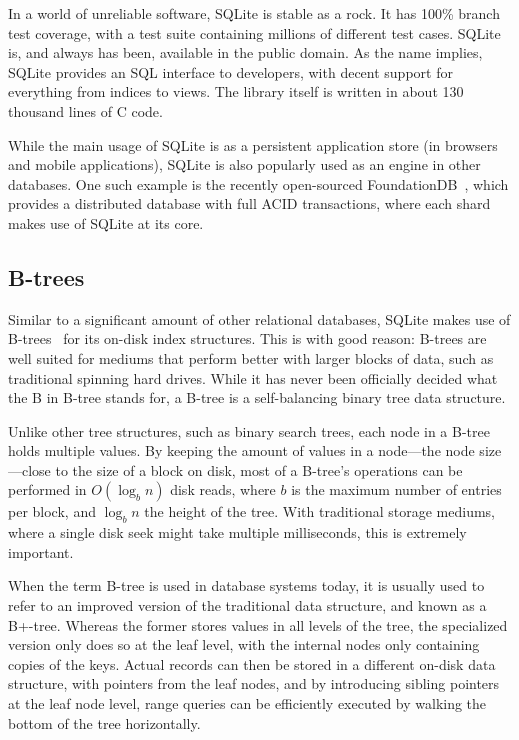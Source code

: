 In a world of unreliable software, SQLite is stable as a rock. It has 100\%
branch test coverage, with a test suite containing millions of different test
cases. SQLite is, and always has been, available in the public domain. As the
name implies, SQLite provides an SQL interface to developers, with decent support
for everything from indices to views. The library itself is written in about 130
thousand lines of C code.

While the main usage of SQLite is as a persistent application store (\eg in
browsers and mobile applications), SQLite is also popularly used as an engine in
other databases. One such example is the recently open-sourced
FoundationDB~\cite{foundation}, which provides a distributed database with full
ACID transactions, where each shard makes use of SQLite at its core.

\subsection{B-trees}\label{sec:btree}
Similar to a significant amount of other relational databases, SQLite makes use
of B-trees~\cite{btree} for its on-disk index structures. This is with good
reason: B-trees are well suited for mediums that perform better with larger
blocks of data, such as traditional spinning hard drives. While it has never
been officially decided what the B in B-tree stands for, a B-tree is a
self-balancing binary tree data structure.

Unlike other tree structures, such as binary search trees, each node in a B-tree
holds multiple values. By keeping the amount of values in a node---the node
size---close to the size of a block on disk, most of a B-tree's operations can
be performed in $ O(\log_b n) $ disk reads, where $ b $ is the maximum number of
entries per block, and $ \log_b n $ the height of the tree. With traditional
storage mediums, where a single disk seek might take multiple milliseconds, this
is extremely important.

When the term B-tree is used in database systems today, it is usually used to
refer to an improved version of the traditional data structure, and known as a
B+-tree. Whereas the former stores values in all levels of the tree, the
specialized version only does so at the leaf level, with the internal nodes only
containing copies of the keys. Actual records can then be stored in a different
on-disk data structure, with pointers from the leaf nodes, and by introducing
sibling pointers at the leaf node level, range queries can be efficiently
executed by walking the bottom of the tree horizontally.

